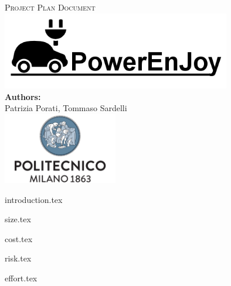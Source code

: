 \documentclass[a4paper,11pt]{article}
\begin{document}
\begin{titlepage}
\begin{center}
\textsc{\LARGE Project Plan Document}\\[1.5cm] %

\includegraphics[width=10cm]{PowerEnJoy.png}\\
\vfill
\vfill
\textbf{Authors:}\\
Patrizia Porati, Tommaso Sardelli\\[2.0cm] 


\vfill
\vfill
\includegraphics[width=50mm]{polimi.png}\\
\end{center}
\end{titlepage}

\tableofcontents
\pagebreak

{introduction.tex}


{size.tex}


{cost.tex}




{risk.tex}

{effort.tex}
\end{document}
